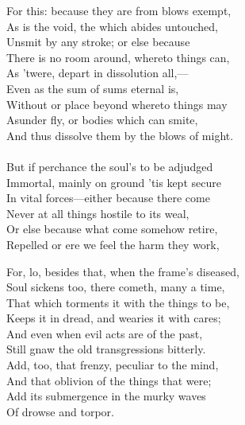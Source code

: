 For this: because they are from blows exempt,\\
As is the void, the which abides untouched,\\
Unsmit by any stroke; or else because\\
There is no room around, whereto things can,\\
As 'twere, depart in dissolution all,—\\
Even as the sum of sums eternal is,\\
Without or place beyond whereto things may\\
Asunder fly, or bodies which can smite,\\
And thus dissolve them by the blows of might.\\
\\
But if perchance the soul's to be adjudged\\
Immortal, mainly on ground 'tis kept secure\\
In vital forces—either because there come\\
Never at all things hostile to its weal,\\
Or else because what come somehow retire,\\
Repelled or ere we feel the harm they work,

For, lo, besides that, when the frame's diseased,\\
Soul sickens too, there cometh, many a time,\\
That which torments it with the things to be,\\
Keeps it in dread, and wearies it with cares;\\
And even when evil acts are of the past,\\
Still gnaw the old transgressions bitterly.\\
Add, too, that frenzy, peculiar to the mind,\\
And that oblivion of the things that were;\\
Add its submergence in the murky waves\\
Of drowse and torpor.


